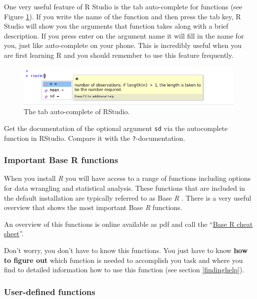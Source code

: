 \documentclass[
]{scrartcl}
\makeatletter
\newenvironment{kframe}{%
\medskip{}
\setlength{\fboxsep}{.8em}
 \def\at@end@of@kframe{}%
 \ifinner\ifhmode%
  \def\at@end@of@kframe{\end{minipage}}%
  \begin{minipage}{\columnwidth}%
 \fi\fi%
 \def\FrameCommand##1{\hskip\@totalleftmargin \hskip-\fboxsep
 \colorbox{shadecolor}{##1}\hskip-\fboxsep
     \hskip-\linewidth \hskip-\@totalleftmargin \hskip\columnwidth}%
 \MakeFramed {\advance\hsize-\width
   \@totalleftmargin\z@ \linewidth\hsize
   \@setminipage}}%
 {\par\unskip\endMakeFramed%
 \at@end@of@kframe}
\newenvironment{rmdblock}[1]
  {
  \begin{itemize}
  \renewcommand{\labelitemi}{
    \raisebox{-.7\height}[0pt][0pt]{
      {\setkeys{Gin}{width=3em,keepaspectratio}\texttt{[image: images/\#1]}}
    }
  }
  \setlength{\fboxsep}{1em}
  \begin{kframe}
  \item
  }
  {
  \end{kframe}
  \end{itemize}
  }
\newenvironment{myexercise}
    {\begin{rmdblock}{exercise_green}}
    {\end{rmdblock}}
\makeatother
\begin{document}
One very useful feature of R Studio is the tab auto-complete for functions (see Figure \ref{fig:autocomplete}). If you write the name of the function and then press the tab key, R Studio will show you the arguments that function takes along with a brief description. If you press enter on the argument name it will fill in the name for you, just like auto-complete on your phone. This is incredibly useful when you are first learning R and you should remember to use this feature frequently.

\begin{figure}
\includegraphics[width=450px]{images/autocomplete} \caption{The tab auto-complete of RStudio.}\label{fig:autocomplete}
\end{figure}

\begin{myexercise}
Get the documentation of the optional argument \texttt{sd} via the
autocomplete function in RStudio. Compare it with the
\texttt{?}-documentation.
\end{myexercise}

\subsubsection{Important Base R functions}\label{important-base-r-functions}

When you install \emph{R} you will have access to a range of functions including options for data wrangling and statistical analysis. These functions that are included in the default installation are typically referred to as Base \emph{R} . There is a very useful overview that shows the most important Base \emph{R} functions.

An overview of this functions is online available as pdf and call the ``\hyperref[cheatsheets]{Base R cheat sheet}''.

Don't worry, you don't have to know this functions. You just have to know \textbf{how to figure out} which function is needed to accomplish you task and where you find to detailed information how to use this function (see section \ref{findinghelp}).

\subsubsection{User-defined functions}\label{user-defined-functions}
\end{document}
